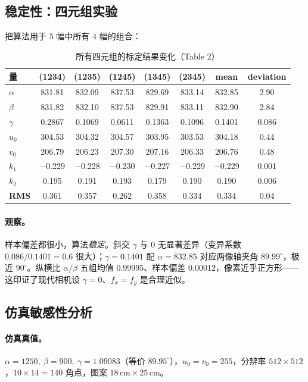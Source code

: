\subsection{稳定性：四元组实验}

把算法用于 $5$ 幅中所有 $4$ 幅的组合：

\begin{table}[ht]\centering\small
\caption{所有四元组的标定结果变化（Table 2）\cite{zhang2000calibration}}
\label{tab:calib-table2}
\begin{tabular}{lccccc cc}
\toprule
量 & (1234) & (1235) & (1245) & (1345) & (2345) & mean & deviation\\
\midrule
$\alpha$ & 831.81 & 832.09 & 837.53 & 829.69 & 833.14 & 832.85 & 2.90\\
$\beta$ & 831.82 & 832.10 & 837.53 & 829.91 & 833.11 & 832.90 & 2.84\\
$\gamma$ & 0.2867 & 0.1069 & 0.0611 & 0.1363 & 0.1096 & 0.1401 & 0.086\\
$u_0$ & 304.53 & 304.32 & 304.57 & 303.95 & 303.53 & 304.18 & 0.44\\
$v_0$ & 206.79 & 206.23 & 207.30 & 207.16 & 206.33 & 206.76 & 0.48\\
$k_1$ & $-$0.229 & $-$0.228 & $-$0.230 & $-$0.227 & $-$0.229 & $-$0.229 & 0.001\\
$k_2$ & 0.195 & 0.191 & 0.193 & 0.179 & 0.190 & 0.190 & 0.006\\
\textbf{RMS} & 0.361 & 0.357 & 0.262 & 0.358 & 0.334 & 0.334 & 0.04\\
\bottomrule
\end{tabular}
\end{table}

\paragraph{观察。}
样本偏差都很小，算法\emph{稳定}。斜交 $\gamma$ 与 $0$ 无显著差异（变异系数 $0.086/0.1401=0.6$ 很大）；$\gamma=0.1401$ 配 $\alpha=832.85$ 对应两像轴夹角 $89.99^\circ$，极近 $90^\circ$。纵横比 $\alpha/\beta$ 五组均值 $0.99995$、样本偏差 $0.00012$，像素近乎正方形——这印证了现代相机设 $\gamma=0$、$f_x=f_y$ 是合理近似。

\subsection{仿真敏感性分析}

\paragraph{仿真真值。}
$\alpha=1250,\ \beta=900,\ \gamma=1.09083$（等价 $89.95^\circ$），$u_0=v_0=255$，分辨率 $512\times512$，$10\times14=140$ 角点，图案 $18\,\mathrm{cm}\times25\,\mathrm{cm}$\cite{zhang2000calibration}。

